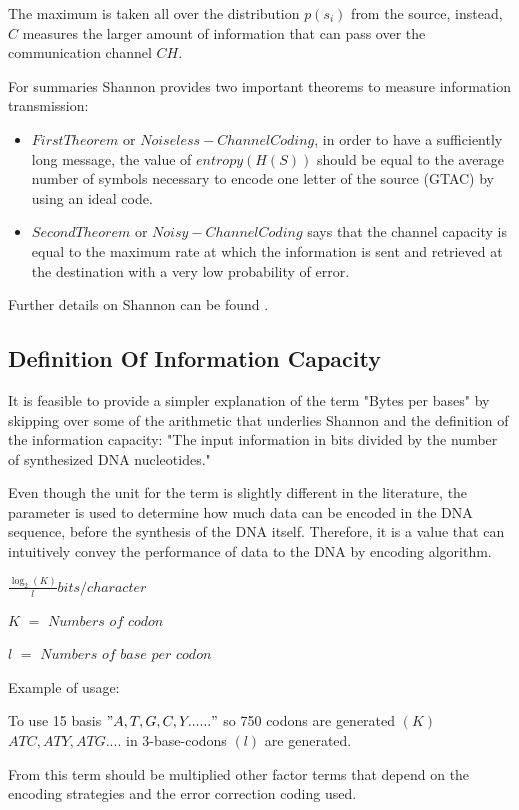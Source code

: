 \documentclass[10pt,twocolumn,twoside]{gsajnl}
\theoremstyle{definition}
\begin{document}
The maximum is taken all over the distribution $p(s_{i})$ from the source, instead, $C$ measures the larger amount of information that can pass over the communication channel $CH$.

For summaries Shannon provides two important theorems to measure information transmission:
\begin{itemize}
    \item $First Theorem$ or $Noiseless-Channel Coding$, in order to have a sufficiently long message, the value of $entropy (H(S))$ should be equal to the average number of symbols necessary to encode one letter of the source (GTAC) by using an ideal code.
    \item $Second Theorem$ or $Noisy-Channel Coding$ says that the channel capacity is equal to the maximum rate at which the information is sent and retrieved at the destination with a very low probability of error.
\end{itemize}
Further details on Shannon can be found \cite{lombardi2016shannon}.

\subsection{Definition Of Information Capacity}
It is feasible to provide a simpler explanation of the term "Bytes per bases" by skipping over some of the arithmetic that underlies Shannon and the definition of the information capacity: "The input information in bits divided by the number of synthesized DNA nucleotides."

Even though the unit for the term is slightly different in the literature, the parameter is used to determine how much data can be encoded in the DNA sequence, before the synthesis of the DNA itself. Therefore, it is a value that can intuitively convey the performance of data to the DNA by encoding algorithm.

\begin{center}
    $\frac{\log_{2}(K)}{l} bits/character $
\end{center}
$K$ $=$ $Numbers$ $of$ $codon$

$l$ $=$ $Numbers$ $of$ $base$ $per$ $codon$

Example of usage:

To use 15 basis $"A,T,G,C,Y......"$ so 750 codons are generated $(K)$ $ATC,ATY,ATG ....$ in 3-base-codons $(l)$ are generated.

From this term should be multiplied other factor terms that depend on the encoding strategies and the error correction coding used.
\end{document}
